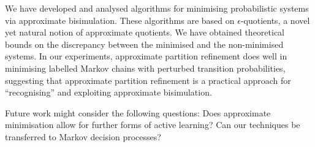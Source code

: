 \documentclass[a4paper,UKenglish,cleveref,autoref,thm-restate]{lipics-v2021}
\begin{document}
We have developed and analysed algorithms for minimising probabilistic systems via approximate bisimulation.
These algorithms are based on $\epsilon$-quotients, a novel yet natural notion of approximate quotients.
We have obtained theoretical bounds on the discrepancy between the minimised and the non-minimised systems.
In our experiments, approximate partition refinement does well in minimising labelled Markov chains with perturbed  transition probabilities,
suggesting that approximate partition refinement is a practical approach for ``recognising'' and exploiting approximate bisimulation.

Future work might consider the following questions: Does approximate minimisation allow for further forms of active learning? Can our techniques be transferred to Markov decision processes?



\newpage\appendix\label{section:appendix}

\end{document}
